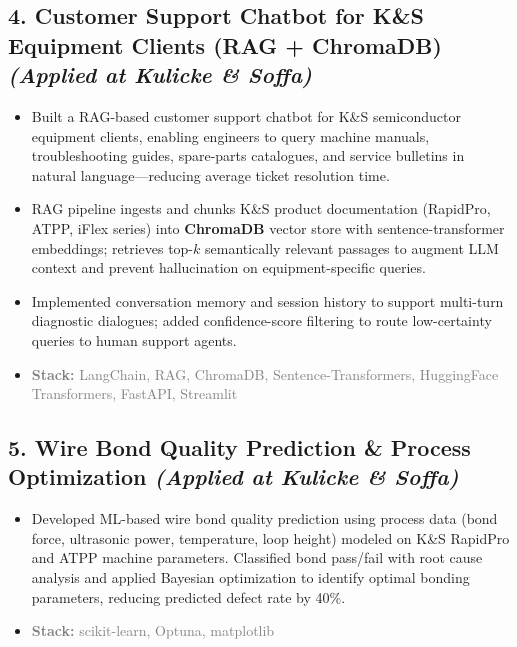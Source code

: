 \documentclass[11pt,a4paper]{article}
\newcommand{\projectstack}[1]{\textcolor{graytext}{\textbf{Stack:} #1}}
\begin{document}
\subsection{4. Customer Support Chatbot for K\&S Equipment Clients (RAG + ChromaDB) \textnormal{\textit{(Applied at Kulicke \& Soffa)}}}
\begin{itemize}[leftmargin=*, nosep, topsep=3pt]
    \item Built a RAG-based customer support chatbot for K\&S semiconductor equipment clients, enabling engineers to query machine manuals, troubleshooting guides, spare-parts catalogues, and service bulletins in natural language---reducing average ticket resolution time.
    \item RAG pipeline ingests and chunks K\&S product documentation (RapidPro, ATPP, iFlex series) into \textbf{ChromaDB} vector store with sentence-transformer embeddings; retrieves top-$k$ semantically relevant passages to augment LLM context and prevent hallucination on equipment-specific queries.
    \item Implemented conversation memory and session history to support multi-turn diagnostic dialogues; added confidence-score filtering to route low-certainty queries to human support agents.
    \item \projectstack{LangChain, RAG, ChromaDB, Sentence-Transformers, HuggingFace Transformers, FastAPI, Streamlit}
\end{itemize}

\subsection{5. Wire Bond Quality Prediction \& Process Optimization \textnormal{\textit{(Applied at Kulicke \& Soffa)}}}
\begin{itemize}[leftmargin=*, nosep, topsep=3pt]
    \item Developed ML-based wire bond quality prediction using process data (bond force, ultrasonic power, temperature, loop height) modeled on K\&S RapidPro and ATPP machine parameters. Classified bond pass/fail with root cause analysis and applied Bayesian optimization to identify optimal bonding parameters, reducing predicted defect rate by 40\%.
    \item \projectstack{scikit-learn, Optuna, matplotlib}
\end{itemize}
\end{document}
